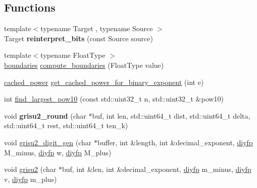 \subsection*{Functions}
\begin{DoxyCompactItemize}
\item 
\mbox{\label{namespacenlohmann_1_1detail_1_1dtoa__impl_a1c5d30eb51e5e994a3f48bde104d2ce8}} 
{\footnotesize template$<$typename Target , typename Source $>$ }\\Target {\bfseries reinterpret\+\_\+bits} (const Source source)
\item 
{\footnotesize template$<$typename Float\+Type $>$ }\\\hyperlink{structnlohmann_1_1detail_1_1dtoa__impl_1_1boundaries}{boundaries} \hyperlink{namespacenlohmann_1_1detail_1_1dtoa__impl_a22b6e37654ac93c6d0d9c06ec1bf5ded}{compute\+\_\+boundaries} (Float\+Type value)
\item 
\hyperlink{structnlohmann_1_1detail_1_1dtoa__impl_1_1cached__power}{cached\+\_\+power} \hyperlink{namespacenlohmann_1_1detail_1_1dtoa__impl_adbf329a18c5cf854a3477327afd2200b}{get\+\_\+cached\+\_\+power\+\_\+for\+\_\+binary\+\_\+exponent} (int e)
\item 
int \hyperlink{namespacenlohmann_1_1detail_1_1dtoa__impl_a36ded358763b5dbcea9867660fbe4e28}{find\+\_\+largest\+\_\+pow10} (const std\+::uint32\+\_\+t n, std\+::uint32\+\_\+t \&pow10)
\item 
\mbox{\label{namespacenlohmann_1_1detail_1_1dtoa__impl_a5bc841e0bee12fd6489d49cf7bd07bb4}} 
void {\bfseries grisu2\+\_\+round} (char $\ast$buf, int len, std\+::uint64\+\_\+t dist, std\+::uint64\+\_\+t delta, std\+::uint64\+\_\+t rest, std\+::uint64\+\_\+t ten\+\_\+k)
\item 
void \hyperlink{namespacenlohmann_1_1detail_1_1dtoa__impl_a9b899c72b0e1e3dd46d75c2b4e6bcdfb}{grisu2\+\_\+digit\+\_\+gen} (char $\ast$buffer, int \&length, int \&decimal\+\_\+exponent, \hyperlink{structnlohmann_1_1detail_1_1dtoa__impl_1_1diyfp}{diyfp} M\+\_\+minus, \hyperlink{structnlohmann_1_1detail_1_1dtoa__impl_1_1diyfp}{diyfp} w, \hyperlink{structnlohmann_1_1detail_1_1dtoa__impl_1_1diyfp}{diyfp} M\+\_\+plus)
\item 
void \hyperlink{namespacenlohmann_1_1detail_1_1dtoa__impl_a05b681dcb8569b9784c6dccfadb01633}{grisu2} (char $\ast$buf, int \&len, int \&decimal\+\_\+exponent, \hyperlink{structnlohmann_1_1detail_1_1dtoa__impl_1_1diyfp}{diyfp} m\+\_\+minus, \hyperlink{structnlohmann_1_1detail_1_1dtoa__impl_1_1diyfp}{diyfp} v, \hyperlink{structnlohmann_1_1detail_1_1dtoa__impl_1_1diyfp}{diyfp} m\+\_\+plus)

\end{DoxyCompactItemize}
